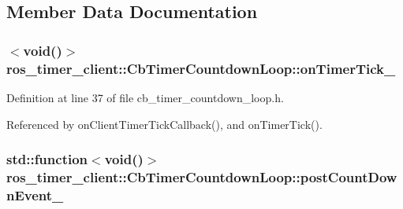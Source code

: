 \subsection{Member Data Documentation}
\subsubsection[{\texorpdfstring{on\+Timer\+Tick\+\_\+}{onTimerTick_}}]{$<$void()$>$ ros\+\_\+timer\+\_\+client\+::\+Cb\+Timer\+Countdown\+Loop\+::on\+Timer\+Tick\+\_\+\hspace{0.3cm}{\ttfamily [private]}}\hypertarget{classros__timer__client_1_1CbTimerCountdownLoop_aebbc8d9b3b4f6a6b8b9dd8b46d9264d6}{}\label{classros__timer__client_1_1CbTimerCountdownLoop_aebbc8d9b3b4f6a6b8b9dd8b46d9264d6}


Definition at line 37 of file cb\+\_\+timer\+\_\+countdown\+\_\+loop.\+h.



Referenced by on\+Client\+Timer\+Tick\+Callback(), and on\+Timer\+Tick().

\subsubsection[{\texorpdfstring{post\+Count\+Down\+Event\+\_\+}{postCountDownEvent_}}]{\setlength{\rightskip}{0pt plus 5cm}std\+::function$<$void()$>$ ros\+\_\+timer\+\_\+client\+::\+Cb\+Timer\+Countdown\+Loop\+::post\+Count\+Down\+Event\+\_\+\hspace{0.3cm}{\ttfamily [private]}}\hypertarget{classros__timer__client_1_1CbTimerCountdownLoop_a4ed7025f6f2d7222fe6471a901f134db}{}\label{classros__timer__client_1_1CbTimerCountdownLoop_a4ed7025f6f2d7222fe6471a901f134db}



